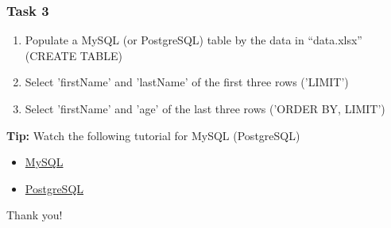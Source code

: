\documentclass{beamer}
\begin{document}
\begin{frame}
    \frametitle{Task 3}
    \begin{enumerate}
        \item Populate a MySQL (or PostgreSQL) table by the data in “data.xlsx” (CREATE TABLE)
        \item Select 'firstName' and 'lastName' of the first three rows  ('LIMIT')
        \item Select 'firstName' and 'age' of the last three rows ('ORDER BY, LIMIT')
    \end{enumerate}
\vfill
\textbf{Tip:} Watch the following tutorial for MySQL (PostgreSQL)
\begin{itemize}
    \item \href{https://www.youtube.com/watch?v=e1LPfehYSgg&list=PLS1QulWo1RIY4auvfxAHS9m_fZJ2wxSse}{MySQL}
    \item \href{https://www.youtube.com/watch?v=xaWlS9HtWYw}{PostgreSQL}
\end{itemize}
\end{frame}

\begin{frame}
\Huge{\centerline{Thank you!}}
\end{frame}

\end{document}
